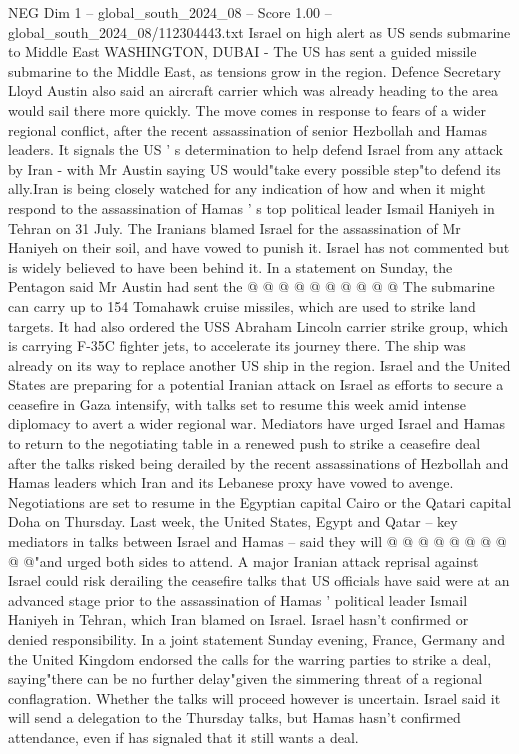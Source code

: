 \begin{textsample}{NEG Dim 1 – global\_south\_2024\_08 – Score 1.00 – global\_south\_2024\_08/112304443.txt}  \label{ex:f1_neg_128}
Israel on high alert as US sends submarine to Middle East WASHINGTON, DUBAI - The US has sent a guided missile submarine to the Middle East, as tensions grow in the region.
Defence Secretary Lloyd Austin also said an aircraft carrier which was already heading to the area would sail there more quickly.
The move comes in response to fears of a wider regional conflict, after the recent assassination of senior Hezbollah and Hamas leaders.
It signals the US ' s determination to help defend Israel from any attack by Iran - with Mr Austin saying US would"take every possible step"to defend its ally.Iran is being closely watched for any indication of how and when it might respond to the assassination of Hamas ' s top political leader Ismail Haniyeh in Tehran on 31 July.
The Iranians blamed Israel for the assassination of Mr Haniyeh on their soil, and have vowed to punish it.
Israel has not commented but is widely believed to have been behind it.
In a statement on Sunday, the Pentagon said Mr Austin had sent the @ @ @ @ @ @ @ @ @ @ The submarine can carry up to 154 Tomahawk cruise missiles, which are used to strike land targets.
It had also ordered the USS Abraham Lincoln carrier strike group, which is carrying F-35C fighter jets, to accelerate its journey there.
The ship was already on its way to replace another US ship in the region.
Israel and the United States are preparing for a potential Iranian attack on Israel as efforts to secure a ceasefire in Gaza intensify, with talks set to resume this week amid intense diplomacy to avert a wider regional war.
Mediators have urged Israel and Hamas to return to the negotiating table in a renewed push to strike a ceasefire deal after the talks risked being derailed by the recent assassinations of Hezbollah and Hamas leaders which Iran and its Lebanese proxy have vowed to avenge.
Negotiations are set to resume in the Egyptian capital Cairo or the Qatari capital Doha on Thursday.
Last week, the United States, Egypt and Qatar -- key mediators in talks between Israel and Hamas -- said they will @ @ @ @ @ @ @ @ @ @"and urged both sides to attend.
A major Iranian attack reprisal against Israel could risk derailing the ceasefire talks that US officials have said were at an advanced stage prior to the assassination of Hamas ' political leader Ismail Haniyeh in Tehran, which Iran blamed on Israel.
Israel hasn't confirmed or denied responsibility.
In a joint statement Sunday evening, France, Germany and the United Kingdom endorsed the calls for the warring parties to strike a deal, saying"there can be no further delay"given the simmering threat of a regional conflagration.
Whether the talks will proceed however is uncertain.
Israel said it will send a delegation to the Thursday talks, but Hamas hasn't confirmed attendance, even if has signaled that it still wants a deal.

\end{textsample}
